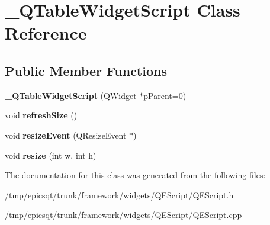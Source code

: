 \hypertarget{class__QTableWidgetScript}{
\section{\_\-QTableWidgetScript Class Reference}
\label{class__QTableWidgetScript}
}
\subsection*{Public Member Functions}
\begin{DoxyCompactItemize}
\item 
\hypertarget{class__QTableWidgetScript_aa1a19071bbb009baffb21f6f7f470357}{
{\bfseries \_\-QTableWidgetScript} (QWidget $\ast$pParent=0)}
\label{class__QTableWidgetScript_aa1a19071bbb009baffb21f6f7f470357}

\item 
\hypertarget{class__QTableWidgetScript_af52d8716fafc1de3806bf63ed5462758}{
void {\bfseries refreshSize} ()}
\label{class__QTableWidgetScript_af52d8716fafc1de3806bf63ed5462758}

\item 
\hypertarget{class__QTableWidgetScript_ae10fee731d92fdf513b36b1567992914}{
void {\bfseries resizeEvent} (QResizeEvent $\ast$)}
\label{class__QTableWidgetScript_ae10fee731d92fdf513b36b1567992914}

\item 
\hypertarget{class__QTableWidgetScript_ae06aa44f8c1d8cd5bf1bdcea1e5b9717}{
void {\bfseries resize} (int w, int h)}
\label{class__QTableWidgetScript_ae06aa44f8c1d8cd5bf1bdcea1e5b9717}

\end{DoxyCompactItemize}


The documentation for this class was generated from the following files:\begin{DoxyCompactItemize}
\item 
/tmp/epicsqt/trunk/framework/widgets/QEScript/QEScript.h\item 
/tmp/epicsqt/trunk/framework/widgets/QEScript/QEScript.cpp\end{DoxyCompactItemize}
